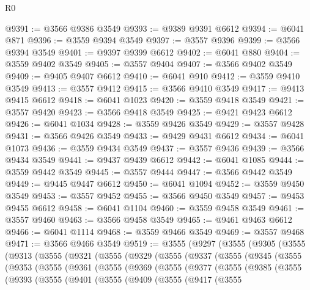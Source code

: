 \begin{lexlean}{R0}
\begin{coremodule}
@9391 := @3566 @9386 @3549
@9393 := @9389 @9391 @6612
@9394 := @6041 @871
@9396 := @3559 @9394 @3549
@9397 := @3557 @9396
@9399 := @3566 @9394 @3549
@9401 := @9397 @9399 @6612
@9402 := @6041 @880
@9404 := @3559 @9402 @3549
@9405 := @3557 @9404
@9407 := @3566 @9402 @3549
@9409 := @9405 @9407 @6612
@9410 := @6041 @910
@9412 := @3559 @9410 @3549
@9413 := @3557 @9412
@9415 := @3566 @9410 @3549
@9417 := @9413 @9415 @6612
@9418 := @6041 @1023
@9420 := @3559 @9418 @3549
@9421 := @3557 @9420
@9423 := @3566 @9418 @3549
@9425 := @9421 @9423 @6612
@9426 := @6041 @1034
@9428 := @3559 @9426 @3549
@9429 := @3557 @9428
@9431 := @3566 @9426 @3549
@9433 := @9429 @9431 @6612
@9434 := @6041 @1073
@9436 := @3559 @9434 @3549
@9437 := @3557 @9436
@9439 := @3566 @9434 @3549
@9441 := @9437 @9439 @6612
@9442 := @6041 @1085
@9444 := @3559 @9442 @3549
@9445 := @3557 @9444
@9447 := @3566 @9442 @3549
@9449 := @9445 @9447 @6612
@9450 := @6041 @1094
@9452 := @3559 @9450 @3549
@9453 := @3557 @9452
@9455 := @3566 @9450 @3549
@9457 := @9453 @9455 @6612
@9458 := @6041 @1104
@9460 := @3559 @9458 @3549
@9461 := @3557 @9460
@9463 := @3566 @9458 @3549
@9465 := @9461 @9463 @6612
@9466 := @6041 @1114
@9468 := @3559 @9466 @3549
@9469 := @3557 @9468
@9471 := @3566 @9466 @3549
@9519 := @3555
    (@9297
      (@3555
        (@9305
          (@3555
            (@9313
              (@3555
                (@9321
                  (@3555
                    (@9329
                      (@3555
                        (@9337
                          (@3555
                            (@9345
                              (@3555
                                (@9353
                                  (@3555
                                    (@9361
                                      (@3555
                                        (@9369
                                          (@3555
                                            (@9377
                                              (@3555
                                                (@9385
                                                  (@3555
                                                    (@9393
                                                      (@3555
                                                        (@9401
                                                          (@3555
                                                            (@9409
                                                              (@3555
                                                                (@9417
                                                                  (@3555

\end{coremodule}
\end{lexlean}
